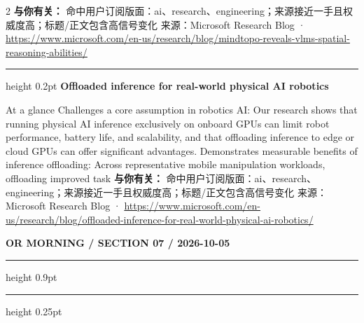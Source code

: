 \documentclass[10.5pt]{ctexart}
\begin{document}
\begin{multicols}{2}
\textbf{与你有关：} 命中用户订阅版面：ai、research、engineering；来源接近一手且权威度高；标题/正文包含高信号变化
{\footnotesize\color{ormuted} 来源：Microsoft Research Blog · \url{https://www.microsoft.com/en-us/research/blog/mindtopo-reveals-vlms-spatial-reasoning-abilities/}}
\vspace{2mm}
\hrule height 0.2pt
\vspace{2mm}
{\large\bfseries Offloaded inference for real-world physical AI robotics}\par
At a glance Challenges a core assumption in robotics AI: Our research shows that running physical AI inference exclusively on onboard GPUs can limit robot performance, battery life, and scalability, and that offloading inference to edge or cloud GPUs can offer significant advantages. Demonstrates measurable benefits of inference offloading: Across representative mobile manipulation workloads, offloading improved task
\textbf{与你有关：} 命中用户订阅版面：ai、research、engineering；来源接近一手且权威度高；标题/正文包含高信号变化
{\footnotesize\color{ormuted} 来源：Microsoft Research Blog · \url{https://www.microsoft.com/en-us/research/blog/offloaded-inference-for-real-world-physical-ai-robotics/}}
\end{multicols}
\newpage
{\small\bfseries OR MORNING / SECTION 07 / 2026-10-05}
\vspace{2mm}
\hrule height 0.9pt
\vspace{1.5mm}
\hrule height 0.25pt
\vspace{4mm}
\end{document}
